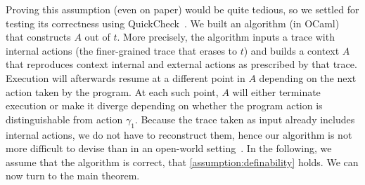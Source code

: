 \documentclass[10pt, conference, compsocconf, letterpaper, times]{IEEEtran}
\begin{document}
\ifsooner{}\fi

Proving this assumption (even on paper) would be quite tedious,
so we settled for testing its correctness using
QuickCheck~\cite{ClaessenH00}.
We built an algorithm (in OCaml) that constructs $A$ out of $t$.
More precisely, the algorithm inputs a trace with internal
actions (the finer-grained trace that erases to $t$)
and builds a context $A$ that reproduces context internal and
external actions as prescribed by that trace.
Execution will afterwards resume at a different point in $A$ depending
on the next action taken by the program.
At each such point, $A$ will either terminate execution or make it
diverge depending on whether the program action is distinguishable
from action $\gamma_1$.
Because the trace taken as input already includes internal actions, we do
not have to reconstruct them, hence our algorithm is not more
difficult to devise than in an open-world setting~\cite{PatrignaniASJCP15}.
In the following, we assume that the algorithm is correct,
\IE that \autoref{assumption:definability} holds.
We can now turn to the main theorem.
\end{document}
